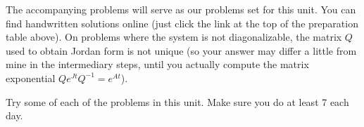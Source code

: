 The accompanying problems will serve as our problems set for this unit.  You can find handwritten solutions online (just click the link at the top of the preparation table above). On problems where the system is not diagonalizable, the matrix $Q$ used to obtain Jordan form is not unique (so your answer may differ a little from mine in the intermediary steps, until you actually compute the matrix exponential $Qe^{Jt}Q^{-1}=e^{At}$).  

Try some of each of the problems in this unit. Make sure you do at least 7 each day.  




